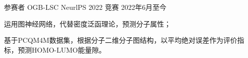 \begin{cventries}
\cventry
{参赛者} %
{OGB-LSC NeurlPS 2022} %
{竞赛} %
{2022年6月至今} %
{
  \begin{cvitems} %
    \item {运用图神经网络，代替密度泛函理论，预测分子属性；}
    \item {基于PCQM4M数据集，根据分子二维分子图结构，以平均绝对误差作为评价指标，预测HOMO-LUMO能量隙。}
  \end{cvitems}
}

\end{cventries}
